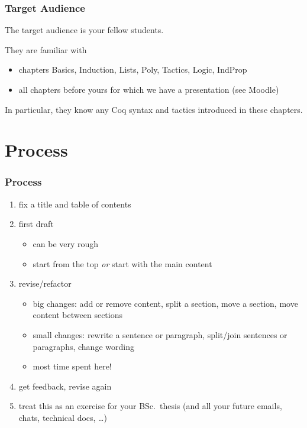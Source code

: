\documentclass[xetex]{beamer}
\begin{document}
\begin{frame}
  \frametitle{Target Audience}

  The target audience is your fellow students.

  \medskip
  \pause

  They are familiar with
  \begin{itemize}
    \item chapters Basics, Induction, Lists, Poly, Tactics, Logic, IndProp
    \item all chapters before yours for which we have a presentation (see Moodle)
  \end{itemize}

  \medskip

  In particular, they know any Coq syntax and tactics introduced in these chapters.
\end{frame}

\section{Process}

\begin{frame}
  \frametitle{Process}

  \begin{enumerate}[<+->]
    \item fix a title and table of contents
    \item first draft
          \begin{itemize}
            \item can be very rough
            \item start from the top \emph{or} start with the main content
          \end{itemize}
    \item revise/refactor
          \begin{itemize}
            \item big changes: add or remove content, split a section, move a section, move content between sections
            \item small changes: rewrite a sentence or paragraph, split/join sentences or paragraphs, change wording
            \item most time spent here!
          \end{itemize}
    \item get feedback, revise again
    \item treat this as an exercise for your BSc.\ thesis (and all your future emails, chats, technical docs, \dots)
  \end{enumerate}
\end{frame}
\end{document}
